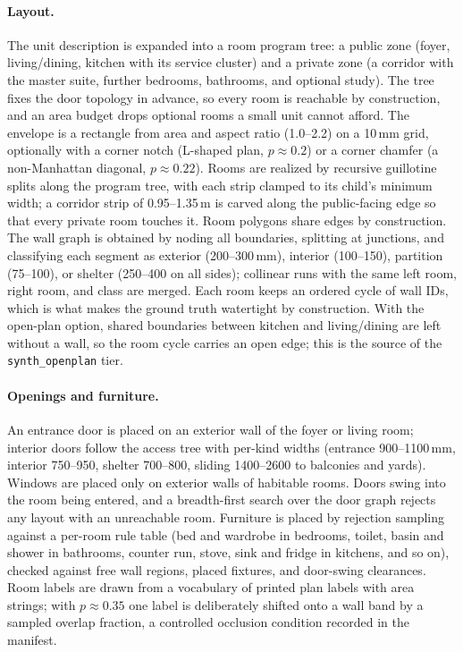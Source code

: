 \documentclass{article}
\begin{document}
\paragraph{Layout.}
The unit description is expanded into a room program tree: a public zone
(foyer, living/dining, kitchen with its service cluster) and a private zone
(a corridor with the master suite, further bedrooms, bathrooms, and optional
study). The tree fixes the door topology in advance, so every room is
reachable by construction, and an area budget drops optional rooms a small
unit cannot afford. The envelope is a rectangle from area and aspect ratio
(1.0--2.2) on a 10\,mm grid, optionally with a corner notch (L-shaped plan,
$p\approx0.2$) or a corner chamfer (a non-Manhattan diagonal,
$p\approx0.22$). Rooms are realized by recursive guillotine splits along the
program tree, with each strip clamped to its child's minimum width; a corridor
strip of 0.95--1.35\,m is carved along the public-facing edge so that every
private room touches it. Room polygons share edges by construction. The wall
graph is obtained by noding all boundaries, splitting at junctions, and
classifying each segment as exterior (200--300\,mm), interior (100--150),
partition (75--100), or shelter (250--400 on all sides); collinear runs with
the same left room, right room, and class are merged. Each room keeps an
ordered cycle of wall IDs, which is what makes the ground truth watertight by
construction. With the open-plan option, shared boundaries between kitchen and
living/dining are left without a wall, so the room cycle carries an open edge;
this is the source of the \texttt{synth\_openplan} tier.

\paragraph{Openings and furniture.}
An entrance door is placed on an exterior wall of the foyer or living room;
interior doors follow the access tree with per-kind widths (entrance
900--1100\,mm, interior 750--950, shelter 700--800, sliding 1400--2600 to
balconies and yards). Windows are placed only on exterior walls of habitable
rooms. Doors swing into the room being entered, and a breadth-first search
over the door graph rejects any layout with an unreachable room. Furniture is
placed by rejection sampling against a per-room rule table (bed and wardrobe
in bedrooms, toilet, basin and shower in bathrooms, counter run, stove, sink
and fridge in kitchens, and so on), checked against free wall regions, placed
fixtures, and door-swing clearances. Room labels are drawn from a vocabulary of
printed plan labels with area strings; with $p\approx0.35$ one label is
deliberately shifted onto a wall band by a sampled overlap fraction, a
controlled occlusion condition recorded in the manifest.
\end{document}
